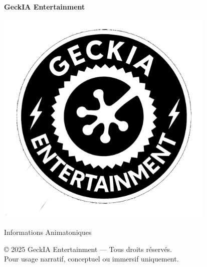 \begin{titlepage} 
  \begin{center}
    \thispagestyle{empty}
    \begin{spacing}{2.0}
      \Large \textbf{GeckIA Entertainment}
    \end{spacing}
    \includegraphics[width=10.5cm]{Resources/GeckAI-Enter.png}
    \vfill
    \begin{spacing}{1.0}
      \Large Informations Animatoniques\\
    \end{spacing}
    \vfill
    \vspace{2.0cm}
    \noindent \small © 2025 GeckIA Entertainment — Tous droits réservés. \\
    Pour usage narratif, conceptuel ou immersif uniquement.
  \end{center}
\end{titlepage}